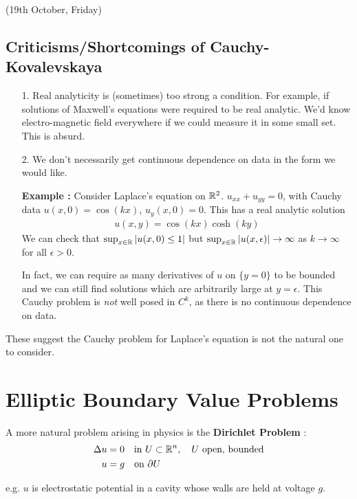 \documentclass[10pt,a4paper]{report}
\begin{document}
\newday

(19th October, Friday)
\s

\subsection*{Criticisms/Shortcomings of Cauchy-Kovalevskaya}
\begin{itemize}
\item[1.] Real analyticity is (sometimes) too strong a condition. For example, if solutions of Maxwell's equations were required to be real analytic. We'd know electro-magnetic field everywhere if we could measure it in some small set. This is absurd.
\item[2.] We don't necessarily get continuous dependence on data in the form we would like.

\textbf{Example :} Consider Laplace's equation on $\mathbb{R}^2$. $u_{xx} + u_{yy} = 0$, with Cauchy data $u(x,0) = \cos (kx)$, $u_y(x,0) =0$. This has a real analytic solution
\begin{align*}
u(x,y) = \cos (kx) \cosh (ky)
\end{align*}
We can check that $\sup_{x\in \mathbb{R}} |u(x,0) \leq 1|$ but $\sup_{x\in \mathbb{R}} |u(x,\epsilon)| \rightarrow \infty$ as $k\rightarrow \infty$ for all $\epsilon >0$.

\quad In fact, we can require as many derivatives of $u$ on $\{ y=0 \}$ to be bounded and we can still find solutions which are arbitrarily large at $y=\epsilon$. This Cauchy problem is \emph{not} well posed in $C^k$, as there is no continuous dependence on data.
\s
\end{itemize}
\s

These suggest the Cauchy problem for Laplace's equation is not the natural one to consider. 

\section*{Elliptic Boundary Value Problems}

A more natural problem arising in physics is the \textbf{Dirichlet Problem} : 
\begin{align*}
\Delta u &= 0\quad \text{in } U\subset \mathbb{R}^n, \quad U \text{ open, bounded} \\
u &= g \quad \text{on } \partial U
\end{align*}

e.g. $u$ is electrostatic potential in a cavity whose walls are held at voltage $g$. 
\s
\end{document}
